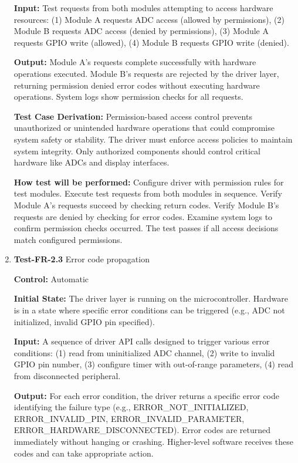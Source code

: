 \documentclass[12pt, titlepage]{article}
\begin{document}
\begin{enumerate}
\textbf{Input:}
Test requests from both modules attempting to access hardware resources: (1)
Module A requests ADC access (allowed by permissions), (2) Module B requests ADC
access (denied by permissions), (3) Module A requests GPIO write (allowed), (4)
Module B requests GPIO write (denied).
					
\textbf{Output:}
Module A's requests complete successfully with hardware operations executed.
Module B's requests are rejected by the driver layer, returning permission
denied error codes without executing hardware operations. System logs show
permission checks for all requests.

\textbf{Test Case Derivation:} 
Permission-based access control prevents unauthorized or unintended hardware
operations that could compromise system safety or stability. The driver must
enforce access policies to maintain system integrity. Only authorized components
should control critical hardware like ADCs and display interfaces.
					
\textbf{How test will be performed:}
Configure driver with permission rules for test modules. Execute test requests
from both modules in sequence. Verify Module A's requests succeed by checking
return codes. Verify Module B's requests are denied by checking for error codes.
Examine system logs to confirm permission checks occurred. The test passes if
all access decisions match configured permissions.

\item{\textbf{Test-FR-2.3} Error code propagation\\}

\textbf{Control:} Automatic
					
\textbf{Initial State:} 
The driver layer is running on the microcontroller. Hardware is in a state where
specific error conditions can be triggered (e.g., ADC not initialized, invalid
GPIO pin specified).
					
\textbf{Input:}
A sequence of driver API calls designed to trigger various error conditions: (1)
read from uninitialized ADC channel, (2) write to invalid GPIO pin number, (3)
configure timer with out-of-range parameters, (4) read from disconnected
peripheral.
					
\textbf{Output:}
For each error condition, the driver returns a specific error code identifying
the failure type (e.g., ERROR\_NOT\_INITIALIZED, ERROR\_INVALID\_PIN,
ERROR\_INVALID\_PARAMETER, ERROR\_HARDWARE\_DISCONNECTED). Error codes are
returned immediately without hanging or crashing. Higher-level software receives
these codes and can take appropriate action.


\end{enumerate}
\end{document}
